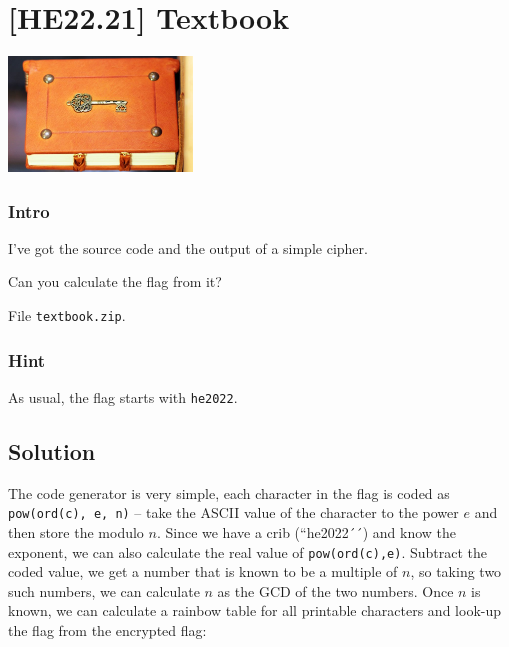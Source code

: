 
\hypertarget{he22.21}{%
\chapter{[HE22.21] Textbook}\label{he22.21}}

\begin{marginfigure}
	\includegraphics[width=49mm]{level5/challenge21.jpg}
\end{marginfigure}
\subsection{Intro}
I've got the source code and the output of a simple cipher.

\noindent Can you calculate the flag from it?

\noindent File \verb+textbook.zip+.

\subsection{Hint}

As usual, the flag starts with \verb+he2022+.

\section{Solution}\label{hv22.21solution}
The code generator is very simple, each character in the flag is coded as
\verb+pow(ord(c), e, n)+ -- take the ASCII value of the character to the power
$e$ and then store the modulo $n$.  Since we have a crib (``he2022´´) and know
the exponent, we can also calculate the real value of \verb+pow(ord(c),e)+.
Subtract the coded value, we get a number that is known to be a multiple of
$n$, so taking two such numbers, we can calculate $n$ as the GCD of the two
numbers.  Once $n$ is known, we can calculate a rainbow table for all printable
characters and look-up the flag from the encrypted flag:

